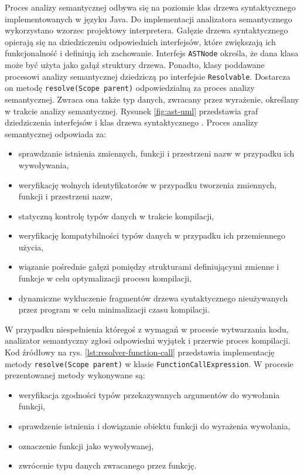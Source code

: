 Proces analizy semantycznej odbywa się na poziomie klas drzewa syntaktycznego implementowanych w języku Java. Do implementacji analizatora semantycznego wykorzystano wzorzec projektowy interpretera. Gałęzie drzewa syntaktycznego opierają się na dziedziczeniu odpowiednich interfejsów, które zwiększają ich funkcjonalność i definiują ich zachowanie. Interfejs \lstinline|ASTNode| określa, że dana klasa może być użyta jako gałąź struktury drzewa. Ponadto, klasy poddawane procesowi analizy semantycznej dziedziczą po interfejsie \lstinline|Resolvable|. Dostarcza on metodę \lstinline|resolve(Scope parent)| odpowiedzialną za proces analizy semantycznej. Zwraca ona także typ danych, zwracany przez wyrażenie, określany w trakcie analizy semantycznej. Rysunek \ref{fig:ast-uml} przedstawia graf  dziedziczenia interfejsów i klas drzewa syntaktycznego . Proces analizy semantycznej odpowiada za:
\begin{itemize}
\item sprawdzanie istnienia zmiennych, funkcji i przestrzeni nazw w przypadku ich wywoływania,
\item weryfikację wolnych identyfikatorów w przypadku tworzenia zmiennych, funkcji i przestrzeni nazw,
\item statyczną kontrolę typów danych w trakcie kompilacji,
\item weryfikację kompatybilności typów danych w przypadku ich przemiennego użycia,
\item wiązanie pośrednie gałęzi pomiędzy strukturami definiującymi zmienne i funkcje w celu optymalizacji procesu kompilacji,
\item dynamiczne wykluczenie fragmentów drzewa syntaktycznego nieużywanych przez program w celu minimalizacji czasu kompilacji.
\end{itemize}
W przypadku niespełnienia któregoś z wymagań w procesie wytwarzania kodu, analizator semantyczny zgłosi odpowiedni wyjątek i przerwie proces kompilacji. Kod źródłowy na rys.  \ref{lst:resolver-function-call} przedstawia implementację metody \lstinline|resolve(Scope parent)| w klasie \mbox{\lstinline|FunctionCallExpression|.} W procesie prezentowanej metody wykonywane są:
\begin{itemize}
\item weryfikacja zgodności typów przekazywanych argumentów do wywołania funkcji,
\item sprawdzenie istnienia i dowiązanie obiektu funkcji do wyrażenia wywołania,
\item oznaczenie funkcji jako wywoływanej,
\item zwrócenie typu danych zwracanego przez funkcję.
\end{itemize}
